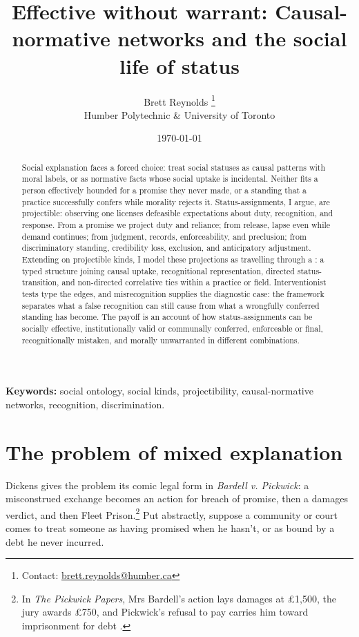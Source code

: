 \documentclass[12pt]{article}
\title{Effective without warrant: Causal-normative networks and the social life of status}
\author{Brett Reynolds \orcidlink{0000-0003-0073-7195}%
\thanks{Contact: \href{mailto:brett.reynolds@humber.ca}{brett.reynolds@humber.ca}}\\
Humber Polytechnic \& University of Toronto}
\date{\today}
\begin{document}
\maketitle

\begin{abstract}
Social explanation faces a forced choice: treat social statuses as causal patterns with moral labels, or as normative facts whose social uptake is incidental. Neither fits a person effectively hounded for a promise they never made, or a standing that a practice successfully confers while morality rejects it. Status-assignments, I argue, are projectible: observing one licenses defeasible expectations about duty, recognition, and response. From a promise we project duty and reliance; from release, lapse even while demand continues; from judgment, records, enforceability, and preclusion; from discriminatory standing, credibility loss, exclusion, and anticipatory adjustment. Extending \textcite{khalidi2018nodes} on projectible kinds, I model these projections as travelling through a : a typed structure joining causal uptake, recognitional representation, directed status-transition, and non-directed correlative ties within a practice or field. Interventionist tests type the edges, and misrecognition supplies the diagnostic case: the framework separates what a false recognition can still cause from what a wrongfully conferred standing has become. The payoff is an account of how status-assignments can be socially effective, institutionally valid or communally conferred, enforceable or final, recognitionally mistaken, and morally unwarranted in different combinations.
\end{abstract}

\noindent\textbf{Keywords:} social ontology, social kinds, projectibility, causal-normative networks, recognition, discrimination.

\section{The problem of mixed explanation}
\label{sec:problem}

Dickens gives the problem its comic legal form in \emph{Bardell v. Pickwick}: a misconstrued exchange becomes an action for breach of promise, then a damages verdict, and then Fleet Prison.\footnote{In \emph{The Pickwick Papers}, Mrs Bardell's action lays damages at \pounds 1,500, the jury awards \pounds 750, and Pickwick's refusal to pay carries him toward imprisonment for debt \citep[chaps.~26, 34, 40--41]{dickens1837PickwickPapers}.} Put abstractly, suppose a community or court comes to treat someone as having promised when he hasn't, or as bound by a debt he never incurred.
\end{document}
